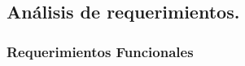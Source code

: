 \documentclass[runningheads]{llncs}
\begin{document}
\section{}
\section{}
\section{}
\subsection{Análisis de requerimientos.}

\subsubsection{Requerimientos Funcionales}
\end{document}
